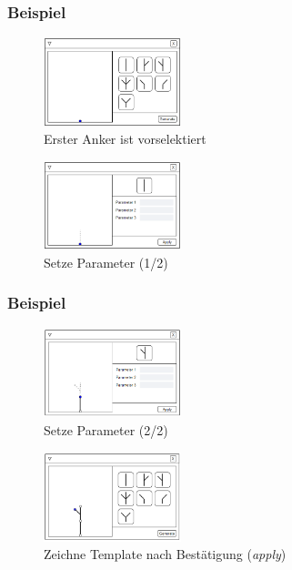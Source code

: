 \documentclass[12pt]{beamer}
\begin{document}
    \begin{frame}
        \frametitle{Beispiel}
        \begin{figure}
            \centering
            \includegraphics[width=4cm]{../images/UI_1.PNG}
            \caption{Erster Anker ist vorselektiert}
        \end{figure}
        \begin{figure}
            \centering
            \includegraphics[width=4cm]{../images/UI_2.PNG}
            \caption{Setze Parameter (1/2)}
        \end{figure}
    \end{frame}

    \begin{frame}
        \frametitle{Beispiel}
        \begin{figure}
            \centering
            \includegraphics[width=4cm]{../images/UI_4.PNG}
            \caption{Setze Parameter (2/2)}
        \end{figure}
        \begin{figure}
            \centering
            \includegraphics[width=4cm]{../images/UI_5.PNG}
            \caption{Zeichne Template nach Bestätigung (\textit{apply})}
        \end{figure}
    \end{frame}
\end{document}
